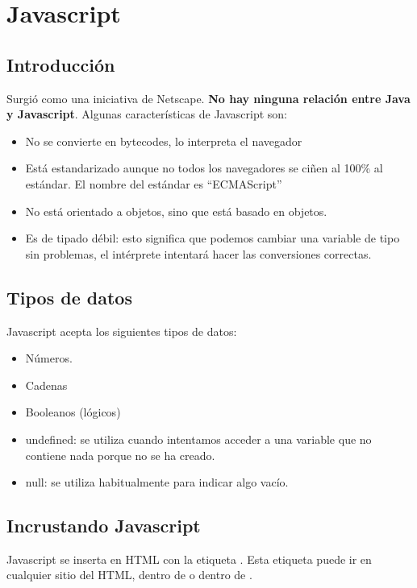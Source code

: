\documentclass[letterpaper,10pt,spanish]{sphinxmanual}
\begin{document}
\chapter{Javascript}
\label{tema4:javascript}\label{tema4::doc}

\section{Introducción}
\label{tema4:introduccion}
Surgió como una iniciativa de Netscape. \textbf{No hay ninguna relación entre Java y Javascript}. Algunas características de Javascript son:
\begin{itemize}
\item {} 
No se convierte en bytecodes, lo interpreta el navegador

\item {} 
Está estandarizado aunque no todos los navegadores se ciñen al 100\% al estándar. El nombre del estándar es ``ECMAScript''

\item {} 
No está orientado a objetos, sino que está basado en objetos.

\item {} 
Es de tipado débil: esto significa que podemos cambiar una variable de tipo sin problemas, el intérprete intentará hacer las conversiones correctas.

\end{itemize}


\section{Tipos de datos}
\label{tema4:tipos-de-datos}
Javascript acepta los siguientes tipos de datos:
\begin{itemize}
\item {} 
Números.

\item {} 
Cadenas

\item {} 
Booleanos (lógicos)

\item {} 
undefined: se utiliza cuando intentamos acceder a una variable que no contiene nada porque no se ha creado.

\item {} 
null: se utiliza habitualmente para indicar algo vacío.

\end{itemize}


\section{Incrustando Javascript}
\label{tema4:incrustando-javascript}
Javascript se inserta en HTML con la etiqueta . Esta etiqueta puede ir en cualquier sitio del HTML, dentro de  o dentro de .
\end{document}
